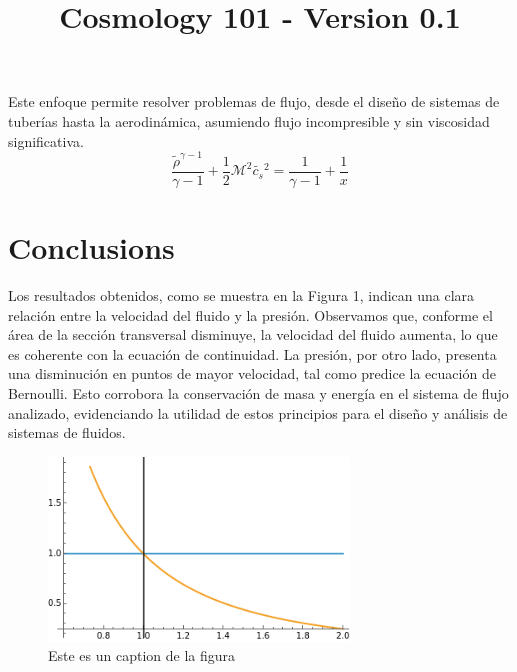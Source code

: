 \documentclass{article}\usepackage{graphicx} \usepackage{amsmath} \usepackage{colortbl}\title{Cosmology 101 - Version 0.1}
\begin{document}
Este enfoque permite resolver problemas de flujo, desde el diseño de sistemas de tuberías hasta la aerodinámica, asumiendo flujo incompresible y sin viscosidad significativa. \begin{equation}\frac{\tilde{\rho }^{\gamma -1}}{\gamma -1}+\frac{1}{2} \mathcal{M}^2 \tilde{c_s}{}^2=\frac{1}{\gamma -1}+\frac{1}{x} \label{ber2} \end{equation}\section{Conclusions}
Los resultados obtenidos, como se muestra en la Figura 1, indican una clara relación entre la velocidad del fluido y la presión. Observamos que, conforme el área de la sección transversal disminuye, la velocidad del fluido aumenta, lo que es coherente con la ecuación de continuidad. La presión, por otro lado, presenta una disminución en puntos de mayor velocidad, tal como predice la ecuación de Bernoulli. Esto corrobora la conservación de masa y energía en el sistema de flujo analizado, evidenciando la utilidad de estos principios para el diseño y análisis de sistemas de fluidos.\begin{figure}\includegraphics[width=8.0cm]{images/imagen1.png}\caption{Este es un caption de la figura}\label{pl1}\end{figure}
\end{document}
